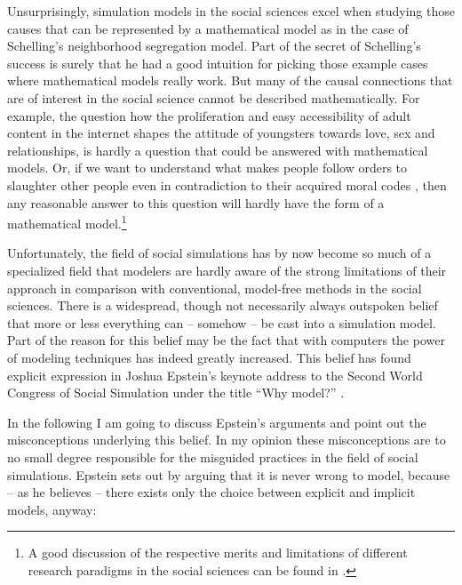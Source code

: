 \documentclass[12pt, english, a4paper]{article}
\begin{document}
Unsurprisingly, simulation models in the social sciences excel when
studying those causes that can be represented by a mathematical model
as in the case of Schelling’s neighborhood segregation model. Part of
the secret of Schelling’s success is surely that he had a good
intuition for picking those example cases where mathematical models
really work. But many of the causal connections that are of interest
in the social science cannot be described mathematically.  For
example, the question how the proliferation and easy accessibility of
adult content in the internet shapes the attitude of youngsters
towards love, sex and relationships, is hardly a question that could
be answered with mathematical models. Or, if we want to understand
what makes people follow orders to slaughter other people even in
contradiction to their acquired moral codes
\citep{Browning:1992}, then any reasonable answer to this
question will hardly have the form of a mathematical model.\footnote{A
  good discussion of the respective merits and limitations of
  different research paradigms in the social sciences can be found in
  \citet{moses-knutsen:2012}.}

Unfortunately, the field of social simulations has by now become so
much of a specialized field that modelers are hardly aware of the
strong limitations of their approach in comparison with conventional,
model-free methods in the social sciences. There is a widespread,
though not necessarily always outspoken belief that more or less
everything can -- somehow -- be cast into a simulation model. Part of
the reason for this belief may be the fact that with computers the
power of modeling techniques has indeed greatly increased. This belief
has found explicit expression in Joshua Epstein’s keynote address to
the Second World Congress of Social Simulation under the title “Why
model?” \citep{epstein:2008}.

In the following I am going to discuss Epstein’s arguments and point
out the misconceptions underlying this belief. In my opinion these
misconceptions are to no small degree responsible for the misguided
practices in the field of social simulations.  Epstein sets out by
arguing that it is never wrong to model, because – as he believes –
there exists only the choice between explicit and implicit models,
anyway:
\end{document}
